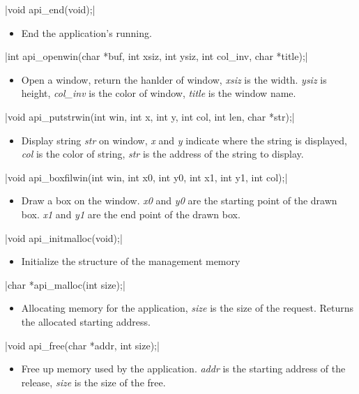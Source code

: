 \documentclass{swfcthesis}
\begin{document}
\csingle|void api_end(void);|
\begin{itemize}
\item End the application's running.
\end{itemize}

\csingle|int api_openwin(char *buf, int xsiz, int ysiz, int col_inv, char *title);|
\begin{itemize}
\item Open a window, return the hanlder of window, \emph{xsiz} is the width. \emph{ysiz}
  is height, \emph{col\_inv} is the color of window, \emph{title} is the window name.
\end{itemize}

\csingle|void api_putstrwin(int win, int x, int y, int col, int len, char *str);|
\begin{itemize}
\item Display string \emph{str} on window, \emph{x} and \emph{y} indicate where the string
  is displayed, \emph{col} is the color of string, \emph{str} is the address of the string
  to display.
\end{itemize}

\csingle|void api_boxfilwin(int win, int x0, int y0, int x1, int y1, int col);|
\begin{itemize}
\item Draw a box on the window. \emph{x0} and \emph{y0} are the starting point of the
  drawn box. \emph{x1} and \emph{y1} are the end point of the drawn box.
  
\end{itemize}

\csingle|void api_initmalloc(void);|
\begin{itemize}
\item Initialize the structure of the management memory
\end{itemize}

\csingle|char *api_malloc(int size);|
\begin{itemize}
\item Allocating memory for the application, \emph{size} is the size of the
  request. Returns the allocated starting address.
  
\end{itemize}

\csingle|void api_free(char *addr, int size);|
\begin{itemize}
\item Free up memory used by the application. \emph{addr} is the starting address of the
  release, \emph{size} is the size of the free.
\end{itemize}
\end{document}
